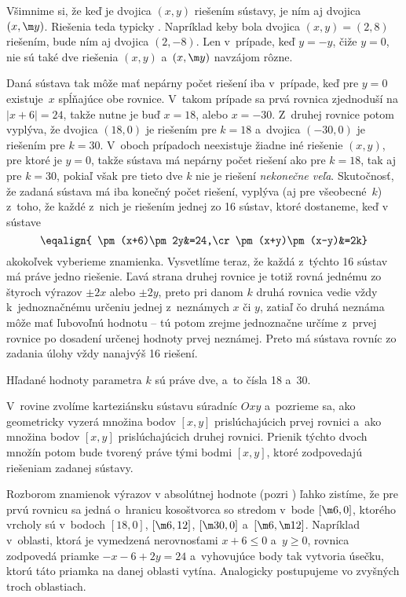 {%
Všimnime si, že keď je dvojica $(x,y)$
riešením sústavy, je ním aj dvojica $(x,\m y)$. Riešenia teda typicky
. Napríklad keby bola dvojica $(x,y)=(2,8)$
riešením, bude ním aj dvojica ${(2,-8)}$.
Len v~prípade, keď ${y=-y}$, čiže $y=0$, nie sú také dve riešenia
$(x,y)$ a~$(x,\m y)$ navzájom rôzne.

Daná sústava tak môže mať nepárny počet riešení iba v~prípade,
keď pre ${y=0}$ existuje~$x$ spĺňajúce obe rovnice.
V~takom prípade sa prvá rovnica zjednoduší na $|{x+6}|=24$,
takže nutne je buď $x=18$, alebo $x={-30}$. Z~druhej rovnice potom vyplýva,
že dvojica $(18,0)$ je riešením pre
$k=18$ a~dvojica $({-30},0)$ je riešením pre $k=30$. V~oboch prípadoch
neexistuje žiadne iné riešenie $(x,y)$, pre ktoré je $y=0$, takže
sústava má nepárny počet riešení ako pre $k=18$, tak aj pre $k=30$,
pokiaľ však pre tieto dve $k$ nie je riešení {\it nekonečne veľa}.
Skutočnosť, že zadaná sústava má iba konečný počet riešení, vyplýva (aj pre všeobecné~$k$) z~toho, že každé z~nich je riešením jednej zo 16 sústav,
ktoré dostaneme, keď v~ sústave
$$\eqalign{
\pm(x+6)\pm2y&=24,\cr
\pm(x+y)\pm(x-y)&=2k}
$$
akokoľvek vyberieme znamienka. Vysvetlíme teraz, že
každá z~týchto 16 sústav má práve jedno riešenie. Ľavá strana
druhej rovnice je totiž rovná jednému zo štyroch výrazov $\pm2x$ alebo
$\pm2y$, preto pri danom $k$ druhá rovnica vedie vždy
k~jednoznačnému určeniu jednej z~neznámych $x$ či $y$,
zatiaľ čo druhá neznáma môže mať ľubovoľnú hodnotu --
tú potom zrejme jednoznačne určíme z~prvej rovnice po
dosadení určenej hodnoty prvej neznámej. Preto má sústava rovníc zo
zadania úlohy vždy nanajvýš 16 riešení.

\Zav
Hľadané hodnoty parametra $k$ sú práve dve, a~to
čísla 18 a~30.


\Jres
V~rovine zvolíme karteziánsku sústavu
súradníc $Oxy$ a~pozrieme sa, ako geometricky vyzerá
množina bodov $[x,y]$ prislúchajúcich prvej rovnici a~ako
množina bodov $[x,y]$ prislúchajúcich druhej rovnici. Prienik týchto dvoch
množín potom bude tvorený práve tými bodmi $[x,y]$, ktoré zodpovedajú
riešeniam zadanej sústavy.

Rozborom znamienok výrazov v absolútnej hodnote (pozri \obr) ľahko zistíme,
že pre prvú rovnicu sa jedná o~hranicu kosoštvorca so stredom
v~bode $[\m6,0]$,
ktorého vrcholy sú v~bodoch $[18,0]$, $[\m6,12]$, $[\m30,0]$
a~$[\m6,\m12]$. Napríklad v~oblasti, ktorá je vymedzená
nerovnosťami $x+6\leq0$ a~$y\geq0$, rovnica zodpovedá priamke ${-x-6+2y}=24$
a~vyhovujúce body tak vytvoria úsečku, ktorú táto priamka na danej
oblasti vytína. Analogicky postupujeme vo zvyšných troch oblastiach.
%

}
